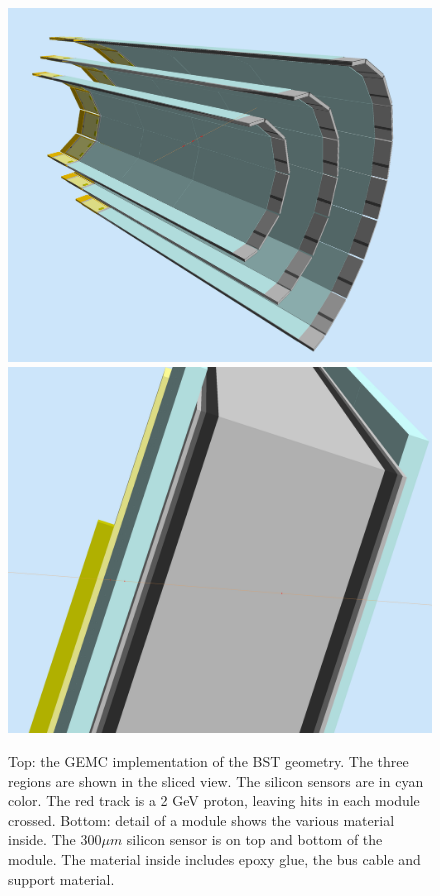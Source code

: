 \begin{figure}
	\centering
	\includegraphics[width=0.95\columnwidth,keepaspectratio]{img/bstGeometry.png}
	\includegraphics[width=0.95\columnwidth,keepaspectratio]{img/bstDetail.png}
	\caption{Top: the GEMC implementation of the BST geometry. The three regions are shown in the sliced view. The silicon sensors are
           in cyan color. The red track is a 2 GeV proton, leaving hits in each module crossed. Bottom: detail of a module shows
           the various material inside. The $300 \mu m$ silicon sensor is on top and bottom of the module.
           The material inside includes epoxy glue, the bus cable and support material. }
	\label{fig:bstGeometry}
\end{figure}


